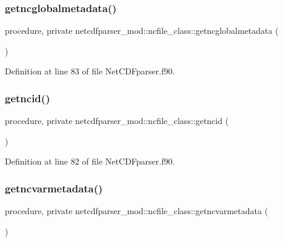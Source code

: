 \subsubsection{\texorpdfstring{getncglobalmetadata()}{getncglobalmetadata()}}
{\footnotesize\ttfamily procedure, private netcdfparser\+\_\+mod\+::ncfile\+\_\+class\+::getncglobalmetadata (\begin{DoxyParamCaption}{ }\end{DoxyParamCaption})\hspace{0.3cm}{\ttfamily [private]}}



Definition at line 83 of file Net\+C\+D\+Fparser.\+f90.

\mbox{\label{structnetcdfparser__mod_1_1ncfile__class_a78eb48e6493c1f48f44b89517addf2bc}} 
\subsubsection{\texorpdfstring{getncid()}{getncid()}}
{\footnotesize\ttfamily procedure, private netcdfparser\+\_\+mod\+::ncfile\+\_\+class\+::getncid (\begin{DoxyParamCaption}{ }\end{DoxyParamCaption})\hspace{0.3cm}{\ttfamily [private]}}



Definition at line 82 of file Net\+C\+D\+Fparser.\+f90.

\mbox{\label{structnetcdfparser__mod_1_1ncfile__class_a87e2ab9be12dd33782a39be6103c05b4}} 
\subsubsection{\texorpdfstring{getncvarmetadata()}{getncvarmetadata()}}
{\footnotesize\ttfamily procedure, private netcdfparser\+\_\+mod\+::ncfile\+\_\+class\+::getncvarmetadata (\begin{DoxyParamCaption}{ }\end{DoxyParamCaption})\hspace{0.3cm}{\ttfamily [private]}}



